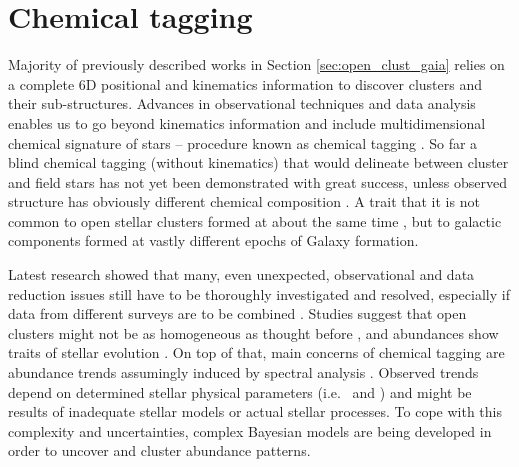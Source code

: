 \section{Chemical tagging}
Majority of previously described works in Section \ref{sec:open_clust_gaia} relies on a complete 6D positional and kinematics information to discover clusters and their sub-structures. Advances in observational techniques and data analysis enables us to go beyond kinematics information and include multidimensional chemical signature of stars -- procedure known as chemical tagging \cite{2002ARA&A..40..487F, 2010ApJ...721..582B}. So far a blind chemical tagging (without kinematics) that would delineate between cluster and field stars has not yet been demonstrated with great success, unless observed structure has obviously different chemical composition \cite{2016ApJ...833..262H}. A trait that it is not common to open stellar clusters formed at about the same time \cite{2019A&A...629A..34G}, but to galactic components formed at vastly different epochs \cite{2018A&A...619A.125A} of Galaxy formation.

Latest research showed that many, even unexpected, observational and data reduction issues still have to be thoroughly investigated and resolved, especially if data from different surveys are to be combined \cite{2019ARA&A..57..571J}. Studies suggest that open clusters might not be as homogeneous as thought before \cite{2016ApJ...817...49B, 2018MNRAS.473.4612K}, and abundances show traits of stellar evolution \cite{2015A&A...577A..47B, 2017ApJ...840...99D, 2018MNRAS.478..425B}. On top of that, main concerns of chemical tagging are abundance trends assumingly induced by spectral analysis \cite{2016ApJ...817...49B, 2019arXiv191208539C, 2020arXiv200103179B}. Observed trends depend on determined stellar physical parameters (i.e. \Teff\ and \vsin) and might be results of inadequate stellar models or actual stellar processes. To cope with this complexity and uncertainties, complex Bayesian models are being developed \cite{2016ApJ...817...49B, 2019ApJ...887...73C} in order to uncover and cluster abundance patterns.

